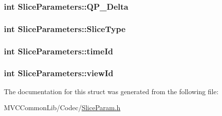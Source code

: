 \label{struct_slice_parameters_a82aa216a74ffaa7d1859aa1cfe135a8b}
\hypertarget{struct_slice_parameters_a5ca0d343251519b63746af21c1cb9f70}{
\subsubsection[{QP\_\-Delta}]{\setlength{\rightskip}{0pt plus 5cm}int {\bf SliceParameters::QP\_\-Delta}}}
\label{struct_slice_parameters_a5ca0d343251519b63746af21c1cb9f70}
\hypertarget{struct_slice_parameters_a8ab83c948c5e095477d918c0664fce0a}{
\subsubsection[{SliceType}]{\setlength{\rightskip}{0pt plus 5cm}int {\bf SliceParameters::SliceType}}}
\label{struct_slice_parameters_a8ab83c948c5e095477d918c0664fce0a}
\hypertarget{struct_slice_parameters_ad6a26fe2f228235e4f0c31c336cf5e12}{
\subsubsection[{timeId}]{\setlength{\rightskip}{0pt plus 5cm}int {\bf SliceParameters::timeId}}}
\label{struct_slice_parameters_ad6a26fe2f228235e4f0c31c336cf5e12}
\hypertarget{struct_slice_parameters_ae570f1ba10b1e091c7519264534a7143}{
\subsubsection[{viewId}]{\setlength{\rightskip}{0pt plus 5cm}int {\bf SliceParameters::viewId}}}
\label{struct_slice_parameters_ae570f1ba10b1e091c7519264534a7143}


The documentation for this struct was generated from the following file:\begin{DoxyCompactItemize}
\item 
MVCCommonLib/Codec/\hyperlink{_slice_param_8h}{SliceParam.h}\end{DoxyCompactItemize}

